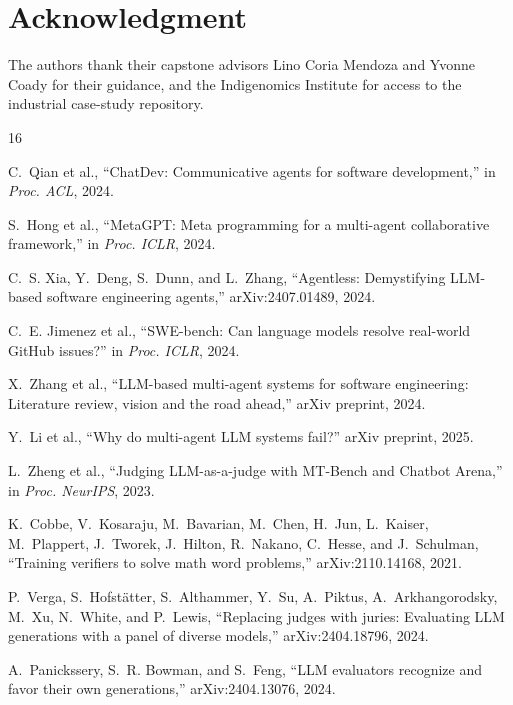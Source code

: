 \documentclass[conference]{IEEEtran}
\begin{document}
\section*{Acknowledgment}
The authors thank their capstone advisors Lino Coria Mendoza and Yvonne
Coady for their guidance, and the Indigenomics Institute for access to the
industrial case-study repository.

\begin{thebibliography}{16}

C.~Qian et al., ``ChatDev: Communicative agents for software development,''
in \emph{Proc. ACL}, 2024.

S.~Hong et al., ``MetaGPT: Meta programming for a multi-agent collaborative
framework,'' in \emph{Proc. ICLR}, 2024.

C.~S. Xia, Y.~Deng, S.~Dunn, and L.~Zhang, ``Agentless: Demystifying
LLM-based software engineering agents,'' arXiv:2407.01489, 2024.

C.~E. Jimenez et al., ``SWE-bench: Can language models resolve real-world
GitHub issues?'' in \emph{Proc. ICLR}, 2024.

X.~Zhang et al., ``LLM-based multi-agent systems for software engineering:
Literature review, vision and the road ahead,'' arXiv preprint, 2024.

Y.~Li et al., ``Why do multi-agent LLM systems fail?'' arXiv preprint, 2025.

L.~Zheng et al., ``Judging LLM-as-a-judge with MT-Bench and Chatbot Arena,''
in \emph{Proc. NeurIPS}, 2023.

K.~Cobbe, V.~Kosaraju, M.~Bavarian, M.~Chen, H.~Jun, L.~Kaiser, M.~Plappert,
J.~Tworek, J.~Hilton, R.~Nakano, C.~Hesse, and J.~Schulman, ``Training
verifiers to solve math word problems,'' arXiv:2110.14168, 2021.

P.~Verga, S.~Hofst\"atter, S.~Althammer, Y.~Su, A.~Piktus, A.~Arkhangorodsky,
M.~Xu, N.~White, and P.~Lewis, ``Replacing judges with juries: Evaluating LLM
generations with a panel of diverse models,'' arXiv:2404.18796, 2024.

A.~Panickssery, S.~R. Bowman, and S.~Feng, ``LLM evaluators recognize and
favor their own generations,'' arXiv:2404.13076, 2024.


\end{thebibliography}
\end{document}
